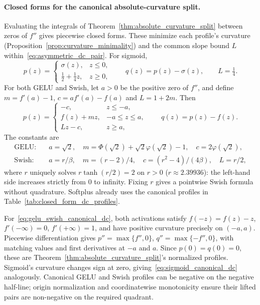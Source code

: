 \paragraph{Closed forms for the canonical absolute-curvature split.}
Evaluating the integrals of Theorem~\ref{thm:absolute_curvature_split} between zeros of $f''$ gives piecewise closed forms. These minimize each profile's curvature (Proposition~\ref{prop:curvature_minimality}) and the common slope bound $L$ within~\eqref{eq:asymmetric_dc_pair}. For sigmoid,
\begin{equation}
    p(z)=\begin{cases}
        \sigma(z),&z\le0,\\
        \tfrac12+\tfrac14z,&z\ge0,
    \end{cases}
    \qquad q(z)=p(z)-\sigma(z),\qquad L=\tfrac14.
    \label{eq:sigmoid_canonical_dc}
\end{equation}
For both GELU and Swish, let $a>0$ be the positive zero of $f''$, and define $m=f'(a)-1$, $c=af'(a)-f(a)$ and $L=1+2m$. Then
\begin{equation}
    p(z)=\begin{cases}
        -c,&z\le-a,\\
        f(z)+mz,&-a\le z\le a,\\
        Lz-c,&z\ge a,
    \end{cases}
    \qquad q(z)=p(z)-f(z).
    \label{eq:gelu_swish_canonical_dc}
\end{equation}
The constants are
\begin{equation}
\begin{aligned}
    \text{GELU:}\quad &a=\sqrt2,\quad
    m=\Phi(\sqrt2)+\sqrt2\varphi(\sqrt2)-1,\quad c=2\varphi(\sqrt2),\\
    \text{Swish:}\quad &a=r/\beta,\quad m=(r-2)/4,\quad
    c=(r^2-4)/(4\beta),\quad L=r/2,
\end{aligned}
    \label{eq:canonical_activation_constants}
\end{equation}
where $r$ uniquely solves $r\tanh(r/2)=2$ on $r>0$ ($r\approx2.39936$): the left-hand side increases strictly from $0$ to infinity. Fixing $r$ gives a pointwise Swish formula without quadrature. Softplus already uses the canonical profiles in Table~\ref{tab:closed_form_dc_profiles}.

For~\eqref{eq:gelu_swish_canonical_dc}, both activations satisfy $f(-z)=f(z)-z$, $f'(-\infty)=0$, $f'(+\infty)=1$, and have positive curvature precisely on $(-a,a)$. Piecewise differentiation gives $p''=\max\{f'',0\}$, $q''=\max\{-f'',0\}$, with matching values and first derivatives at $-a$ and $a$. Since $p(0)=q(0)=0$, these are Theorem~\ref{thm:absolute_curvature_split}'s normalized profiles. Sigmoid's curvature changes sign at zero, giving~\eqref{eq:sigmoid_canonical_dc} analogously. Canonical GELU and Swish profiles can be negative on the negative half-line; origin normalization and coordinatewise monotonicity ensure their lifted pairs are non-negative on the required quadrant.

